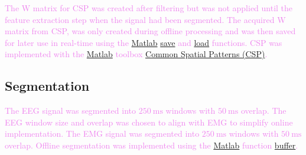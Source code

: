 \textcolor{violet}{The W matrix for CSP was created after filtering but was not applied until the feature extraction step when the signal had been segmented. The acquired W matrix from CSP, was only created during offline processing and was then saved for later use in real-time using the \href{https://se.mathworks.com/products/matlab.html}{Matlab} \href{https://se.mathworks.com/help/matlab/ref/save.html}{save} and \href{https://se.mathworks.com/help/matlab/ref/load.html}{load} functions. CSP was implemented with the \href{https://se.mathworks.com/products/matlab.html}{Matlab} toolbox \href{https://se.mathworks.com/matlabcentral/fileexchange/72204-common-spatial-patterns-csp}{Common Spatial Patterns (CSP)}.}


\subsection{Segmentation}
\textcolor{violet}{The EEG signal was segmented into $250\:\text{ms}$ windows with $50\:\text{ms}$ overlap. The EEG window size and overlap was chosen to align with EMG to simplify online implementation.}
\textcolor{violet}{The EMG signal was segmented into $250\:\text{ms}$ windows with $50\:\text{ms}$ overlap.}
\textcolor{violet}{Offline segmentation was implemented using the \href{https://se.mathworks.com/products/matlab.html}{Matlab} function \href{https://se.mathworks.com/help/signal/ref/buffer.html}{buffer}.}


